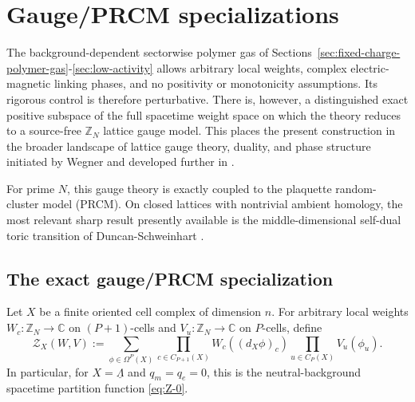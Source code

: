 \section{Gauge/PRCM specializations}
\label{sec:specializations}

The background-dependent sectorwise polymer gas of
Sections~\ref{sec:fixed-charge-polymer-gas}-\ref{sec:low-activity} allows
arbitrary local weights, complex electric-magnetic linking phases, and no
positivity or monotonicity assumptions. Its rigorous control is therefore
perturbative. There is, however, a distinguished exact positive subspace of the
full spacetime weight space on which the theory reduces to a source-free
\(\mathbb Z_N\) lattice gauge model. This places the present construction in the
broader landscape of lattice gauge theory, duality, and phase structure
initiated by Wegner and developed further in
\cite{Wegner:1971app,FradkinShenker1979,BanksRabinovici1979}.

For prime \(N\), this gauge theory is exactly coupled to the plaquette
random-cluster model (PRCM). On closed lattices with nontrivial ambient
homology, the most relevant sharp result presently available is the
middle-dimensional self-dual toric transition of
Duncan-Schweinhart \cite{DuncanSchweinhartTopological}.

\subsection{The exact gauge/PRCM specialization}
\label{sec:specializations-gauge-prcm}

Let \(X\) be a finite oriented cell complex of dimension \(n\). For arbitrary
local weights \(W_c:\mathbb Z_N\to \mathbb C\) on \((P+1)\)-cells and
\(V_u:\mathbb Z_N\to \mathbb C\) on \(P\)-cells, define
\begin{equation}
	\mathcal Z_X(W,V)
	:=
	\sum_{\phi\in \Omega^P(X)}
	\prod_{c\in C_{P+1}(X)} W_c\left((d_X\phi)_c\right)
	\prod_{u\in C_P(X)} V_u(\phi_u).
	\label{eq:general-X}
\end{equation}
In particular, for \(X=\underline\Lambda\) and \(q_m=q_e=0\), this is the
neutral-background spacetime partition function \eqref{eq:Z-0}.

